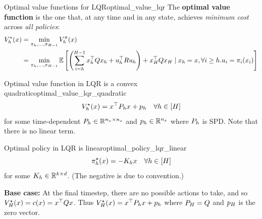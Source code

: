 \documentclass[../main/main]{subfiles}
\begin{document}
\begin{definition}[breakable=false]{Optimal value functions for LQR}{optimal_value_lqr}
    The \textbf{optimal value function} is the one that, at any time and in any state,
    achieves \emph{minimum cost} across \emph{all policies}: \[
        \begin{split}
            V^\star_h(x) &= \min_{\pi_h, \dots, \pi_{H-1}} V^\pi_h(x) \\
            &= \min_{\pi_{h}, \dots, \pi_{H-1}} \operatorname*{\mathbb{E}} \left[ \left( \sum_{i=h}^{H-1} x_h^\top Q x_h + u_h^\top R u_h \right) + x_H^\top Q x_H
            \mid x_h = x, \forall i \ge h. u_i = \pi_i(x_i) \right] \\
        \end{split}
    \]
\end{definition}

\begin{theorem}{Optimal value function in LQR is a convex quadratic}{optimal_value_lqr_quadratic}
    \[
        V^\star_h(x) = x^\top P_h x + p_h \quad \forall h \in [H]
    \]
    for some time-dependent $P_h \in \mathbb{R}^{n_x \times n_x}$ and $p_h \in \mathbb{R}^{n_x}$ where $P_h$ is SPD. Note that there is no linear term.
\end{theorem}

\begin{theorem}{Optimal policy in LQR is linear}{optimal_policy_lqr_linear}
    \[
        \pi^\star_h (x) = - K_h x \quad \forall h \in [H]
    \]
    for some $K_h \in \mathbb{R}^{k \times d}$. (The negative is due to convention.)
\end{theorem}





\textbf{Base case:} At the final timestep, there are no possible actions to take, and so $V^\star_H(x) = c(x) = x^\top Q x$. Thus $V_H^\star(x) = x^\top P_h x + p_h$ where $P_H = Q$ and $p_H$ is the zero vector.
\end{document}
